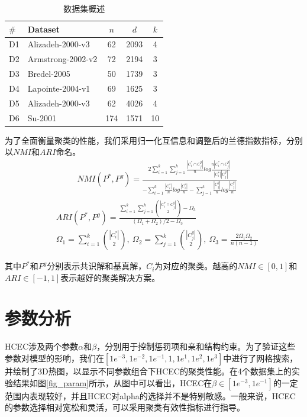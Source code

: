 \documentclass[unicode,pdfcover]{hquthesis}
\begin{document}
\begin{table}[tbh]
	\caption{数据集概述}\label{tab_dataset}
	\centering
	\begin{tabular} {l l|c c c}
		\hline
		$\#$ & Dataset & $n$ & $d$ & $k$ \\
		\hline
		D1 & Alizadeh-2000-v3 & 62 & 2093 & 4 \\
		D2 & Armstrong-2002-v2 & 72 & 2194 & 3 \\
		D3 & Bredel-2005 & 50 & 1739 & 3 \\
		D4 & Lapointe-2004-v1 & 69 & 1625 & 3 \\
		D5 & Alizadeh-2000-v3  & 62 & 4026 & 4 \\
		D6 & Su-2001 & 174 & 1571 & 10 \\
		\hline
	\end{tabular}
\end{table}

为了全面衡量聚类的性能，我们采用归一化互信息\cite{strehl2002cluster}和调整后的兰德指数\cite{Hubert2003Comparing}指标，分别以$NMI$和$ARI$命名。
\begin{equation}
	\begin{aligned}
		& NMI(P^*,P^g)=  \frac{2\sum_{i=1}^{k}\sum_{j=1}^{k}\frac{|C^*_i\cap C^g_j|}{n}log\frac{n|C^*_i\cap C^g_j|}{|C^*_i||C^g_j|}}{-\sum_{i=1}^{k}\frac{|C^*_i|}{n}log\frac{|C^*_i|}{n}-\sum_{j=1}^{k}\frac{|C^g_j|}{n}log\frac{|C^g_j|}{n}}
	\end{aligned}
	\label{Eq33}
\end{equation}
\begin{equation}\label{eq_ARI}
	\begin{aligned}
		& ARI(P^*,P^g)= \frac{\sum_{i=1}^{k}\sum_{j=1}^{k}\binom{|C^*_i\cap C^g_j|}{2}-\Omega_3}{(\Omega_1+\Omega_2)/2-\Omega_3} \\
		& \Omega_1=\sum_{i=1}^{k}\binom{|C^*_i|}{2},~\Omega_2=\sum_{j=1}^{k}\binom{|C^g_j|}{2},~\Omega_3=\frac{2\Omega_1\Omega_2}{n(n-1)}
	\end{aligned}
\end{equation}

其中$P^*$和$P^g$分别表示共识解和基真解，$C_i$为对应的聚类。越高的$NMI\in[0,1]$和$ARI\in[-1,1]$表示越好的聚类解决方案。

\section{参数分析}

HCEC涉及两个参数$\alpha$和$\beta$，分别用于控制惩罚项和亲和结构约束。为了验证这些参数对模型的影响，我们在$[1e^{-3},1e^{-2},1e^{-1},1,1e^{1},1e^{2},1e^{3}]$中进行了网格搜索，并绘制了3D热图，以显示不同参数组合下HCEC的聚类性能。在4个数据集上的实验结果如图\ref{fig_param}所示，从图中可以看出，HCEC在$\beta \in [1e^{-3},1e^{-1}]$的一定范围内表现较好，并且HCEC对alpha的选择并不是特别敏感。一般来说，HCEC的参数选择相对宽松和灵活，可以采用聚类有效性指标进行指导。
\end{document}
